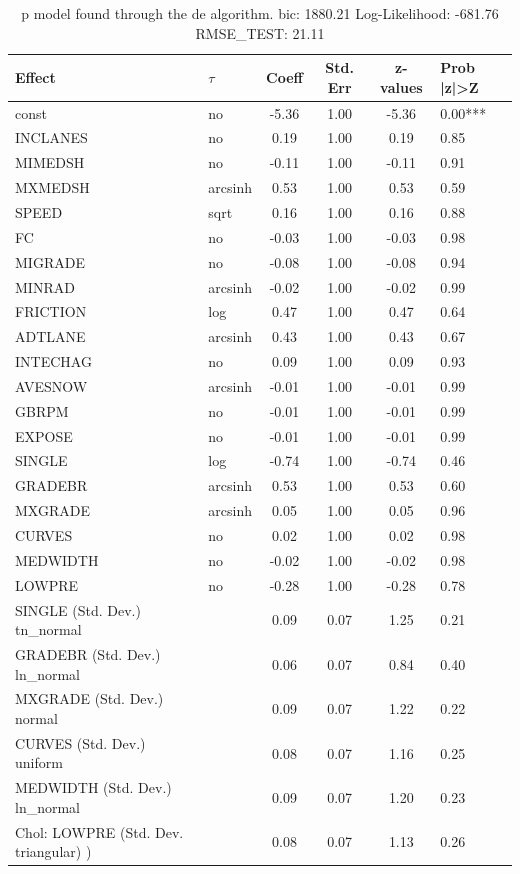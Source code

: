 \begin{table}
	\caption{p model found through the de algorithm. bic: 1880.21 Log-Likelihood: -681.76 RMSE_TEST: 21.11}
	\begin{center}
		\begin{tabular}{|l|l|c|c|c|l|}
			\hline
			Effect & $\tau$ & Coeff & Std. Err & z-values & Prob |z|>Z \\
			\hline
			const & no & -5.36 & 1.00 & -5.36 & 0.00*** \\
			\hline
			INCLANES & no & 0.19 & 1.00 & 0.19 & 0.85 \\
			\hline
			MIMEDSH & no & -0.11 & 1.00 & -0.11 & 0.91 \\
			\hline
			MXMEDSH & arcsinh & 0.53 & 1.00 & 0.53 & 0.59 \\
			\hline
			SPEED & sqrt & 0.16 & 1.00 & 0.16 & 0.88 \\
			\hline
			FC & no & -0.03 & 1.00 & -0.03 & 0.98 \\
			\hline
			MIGRADE & no & -0.08 & 1.00 & -0.08 & 0.94 \\
			\hline
			MINRAD & arcsinh & -0.02 & 1.00 & -0.02 & 0.99 \\
			\hline
			FRICTION & log & 0.47 & 1.00 & 0.47 & 0.64 \\
			\hline
			ADTLANE & arcsinh & 0.43 & 1.00 & 0.43 & 0.67 \\
			\hline
			INTECHAG & no & 0.09 & 1.00 & 0.09 & 0.93 \\
			\hline
			AVESNOW & arcsinh & -0.01 & 1.00 & -0.01 & 0.99 \\
			\hline
			GBRPM & no & -0.01 & 1.00 & -0.01 & 0.99 \\
			\hline
			EXPOSE & no & -0.01 & 1.00 & -0.01 & 0.99 \\
			\hline
			SINGLE & log & -0.74 & 1.00 & -0.74 & 0.46 \\
			\hline
			GRADEBR & arcsinh & 0.53 & 1.00 & 0.53 & 0.60 \\
			\hline
			MXGRADE & arcsinh & 0.05 & 1.00 & 0.05 & 0.96 \\
			\hline
			CURVES & no & 0.02 & 1.00 & 0.02 & 0.98 \\
			\hline
			MEDWIDTH & no & -0.02 & 1.00 & -0.02 & 0.98 \\
			\hline
			LOWPRE & no & -0.28 & 1.00 & -0.28 & 0.78 \\
			\hline
			SINGLE (Std. Dev.) tn_normal &  & 0.09 & 0.07 & 1.25 & 0.21 \\
			\hline
			GRADEBR (Std. Dev.) ln_normal &  & 0.06 & 0.07 & 0.84 & 0.40 \\
			\hline
			MXGRADE (Std. Dev.) normal &  & 0.09 & 0.07 & 1.22 & 0.22 \\
			\hline
			CURVES (Std. Dev.) uniform &  & 0.08 & 0.07 & 1.16 & 0.25 \\
			\hline
			MEDWIDTH (Std. Dev.) ln_normal &  & 0.09 & 0.07 & 1.20 & 0.23 \\
			\hline
			 Chol: LOWPRE (Std. Dev. triangular) ) &  & 0.08 & 0.07 & 1.13 & 0.26 \\
			\hline
		\end{tabular}
	\end{center}
\end{table}